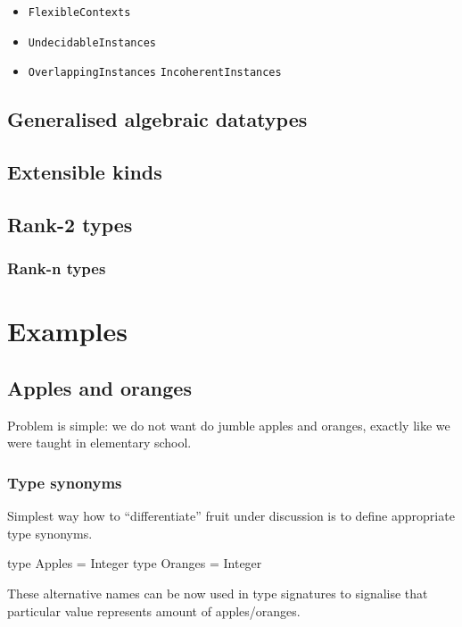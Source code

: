 \documentclass[11pt,oneside,draft]{fithesis2}
\begin{document}
\begin{itemize}
\item \texttt{FlexibleContexts}
\item \texttt{UndecidableInstances}
\item \texttt{OverlappingInstances} \texttt{IncoherentInstances}
\end{itemize}

\section{Generalised algebraic datatypes}

\section{Extensible kinds}

\section{Rank-2 types}

\subsection{Rank-n types}


\chapter{Examples}

\section{Apples and oranges}

Problem is simple: we do not want do jumble apples and oranges,
exactly like we were taught in elementary school.

\subsection{Type synonyms}

Simplest way how to ``differentiate'' fruit under discussion is to define
appropriate type synonyms.
\begin{code}
type Apples  = Integer
type Oranges = Integer
\end{code}
These alternative names can be now used in type signatures to signalise that
particular value represents amount of apples/oranges.
\end{document}
